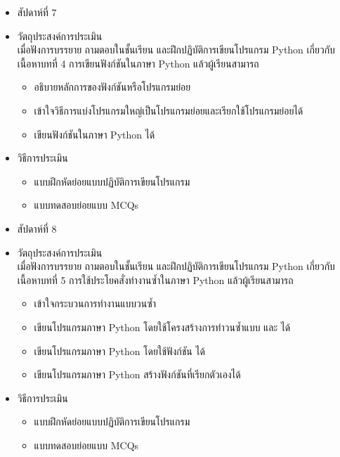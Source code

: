 \begin{tcolorbox}[breakable,enhanced,fonttitle=\bfseries]
\begin{itemize}
\item สัปดาห์ที่ 7
\item วัตถุประสงค์การประเมิน
	\\ เมื่อฟังการบรรยาย ถามตอบในชั้นเรียน และฝึกปฏิบัติการเขียนโปรแกรม Python เกี่ยวกับเนื้อหาบทที่ 4 การเขียนฟังก์ชันในภาษา Python แล้วผู้เรียนสามารถ
	\begin{itemize}
	\item อธิบายหลักการของฟังก์ชันหรือโปรแกรมย่อย
	\item เข้าใจวิธีการแบ่งโปรแกรมใหญ่เป็นโปรแกรมย่อยและเรียกใช้โปรแกรมย่อยได้
	\item เขียนฟังก์ชันในภาษา Python ได้
	\end{itemize}
\item วิธีการประเมิน
	\begin{itemize}
	\item แบบฝึกหัดย่อยแบบปฏิบัติการเขียนโปรแกรม
	\item แบบทดสอบย่อยแบบ MCQs
	\end{itemize}
\end{itemize}
\end{tcolorbox}
\vspace{1.5cm}

\begin{tcolorbox}[breakable,enhanced,fonttitle=\bfseries]
\begin{itemize}
\item สัปดาห์ที่ 8
\item วัตถุประสงค์การประเมิน
	\\ เมื่อฟังการบรรยาย ถามตอบในชั้นเรียน และฝึกปฏิบัติการเขียนโปรแกรม Python เกี่ยวกับเนื้อหาบทที่ 5 การใช้ประโยคสั่งทำงานซ้ำในภาษา Python แล้วผู้เรียนสามารถ
	\begin{itemize}
	\item เข้าใจกระบวนการทำงานแบบวนซ้ำ
	\item เขียนโปรแกรมภาษา Python โดยใช้โครงสร้างการทำวนซ้ำแบบ  และ  ได้
	\item เขียนโปรแกรมภาษา Python โดยใช้ฟังก์ชัน  ได้
	\item เขียนโปรแกรมภาษา Python สร้างฟังก์ชันที่เรียกตัวเองได้
	\end{itemize}
\item วิธีการประเมิน
	\begin{itemize}
	\item แบบฝึกหัดย่อยแบบปฏิบัติการเขียนโปรแกรม
	\item แบบทดสอบย่อยแบบ MCQs
	\end{itemize}
\end{itemize}
\end{tcolorbox}
\vspace{1.5cm}

